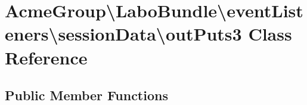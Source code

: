 \hypertarget{class_acme_group_1_1_labo_bundle_1_1event_listeners_1_1session_data_1_1out_puts3}{\section{Acme\+Group\textbackslash{}Labo\+Bundle\textbackslash{}event\+Listeners\textbackslash{}session\+Data\textbackslash{}out\+Puts3 Class Reference}
\label{class_acme_group_1_1_labo_bundle_1_1event_listeners_1_1session_data_1_1out_puts3}
}
\subsection*{Public Member Functions}
